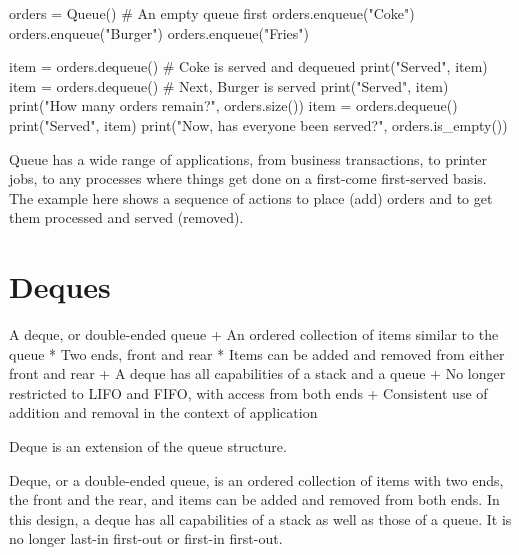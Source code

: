\documentclass[
  letterpaper,
]{scrbook}
\newenvironment{Shaded}{\begin{snugshade}}{\end{snugshade}}
\newcommand{\BuiltInTok}[1]{\textcolor[rgb]{0.00,0.23,0.31}{#1}}
\newcommand{\CommentTok}[1]{\textcolor[rgb]{0.37,0.37,0.37}{#1}}
\newcommand{\NormalTok}[1]{\textcolor[rgb]{0.00,0.23,0.31}{#1}}
\newcommand{\OperatorTok}[1]{\textcolor[rgb]{0.37,0.37,0.37}{#1}}
\newcommand{\StringTok}[1]{\textcolor[rgb]{0.13,0.47,0.30}{#1}}
\begin{document}
\begin{Shaded}
\begin{Highlighting}[]
\NormalTok{orders }\OperatorTok{=}\NormalTok{ Queue()      }\CommentTok{\# An empty queue first}
\NormalTok{orders.enqueue(}\StringTok{"Coke"}\NormalTok{)}
\NormalTok{orders.enqueue(}\StringTok{"Burger"}\NormalTok{)}
\NormalTok{orders.enqueue(}\StringTok{"Fries"}\NormalTok{)}

\NormalTok{item }\OperatorTok{=}\NormalTok{ orders.dequeue()    }\CommentTok{\# Coke is served and dequeued}
\BuiltInTok{print}\NormalTok{(}\StringTok{"Served"}\NormalTok{, item)}
\NormalTok{item }\OperatorTok{=}\NormalTok{ orders.dequeue()    }\CommentTok{\# Next, Burger is served}
\BuiltInTok{print}\NormalTok{(}\StringTok{"Served"}\NormalTok{, item)}
\BuiltInTok{print}\NormalTok{(}\StringTok{"How many orders remain?"}\NormalTok{, orders.size())}
\NormalTok{item }\OperatorTok{=}\NormalTok{ orders.dequeue()}
\BuiltInTok{print}\NormalTok{(}\StringTok{"Served"}\NormalTok{, item)}
\BuiltInTok{print}\NormalTok{(}\StringTok{"Now, has everyone been served?"}\NormalTok{, orders.is\_empty())}
\end{Highlighting}
\end{Shaded}

Queue has a wide range of applications, from business transactions, to
printer jobs, to any processes where things get done on a first-come
first-served basis. The example here shows a sequence of actions to
place (add) orders and to get them processed and served (removed).

\section*{Deques}\label{deques}


A deque, or double-ended queue + An ordered collection of items similar
to the queue * Two ends, front and rear * Items can be added and removed
from either front and rear + A deque has all capabilities of a stack and
a queue + No longer restricted to LIFO and FIFO, with access from both
ends + Consistent use of addition and removal in the context of
application

Deque is an extension of the queue structure.

Deque, or a double-ended queue, is an ordered collection of items with
two ends, the front and the rear, and items can be added and removed
from both ends. In this design, a deque has all capabilities of a stack
as well as those of a queue. It is no longer last-in first-out or
first-in first-out.
\end{document}
